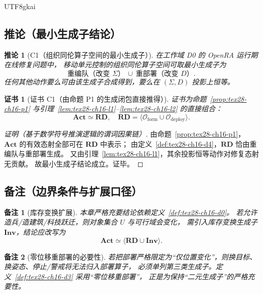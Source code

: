 \documentclass[12pt]{article}
\newtheorem{corollary}{推论}[section]
\newtheorem{remark}{备注}[section]
\newtheorem{Certificate}{证书}[section]
\begin{document}
\begin{CJK*}{UTF8}{gkai}
\subsection{推论（最小生成子结论）}
\label{subsec:tex28-ch16-cor}

\begin{corollary}[C1（组织同伦算子空间的最小生成子）]
\label{cor:tex28-ch16-c1}
在工作域 D0 的 OpenRA 运行期在线修复问题中，
移动单元控制的组织同伦算子空间可取最小生成子为
\[
  \boxed{
    \text{重编队（改变 }\Sigma\text{）}
    \ \cup\
    \text{重部署（改变 }D\text{）}
  }.
\]
任何其他动作要么可由该生成子合成得到，要么在 $(\Sigma,D)$ 投影上恒等。
\end{corollary}

\begin{Certificate}[证书 C1（由命题 P1 的生成闭包直接推得）]
\label{cert:tex28-ch16-c1}
证书为命题~\ref{prop:tex28-ch16-p1} 与引理~\ref{lem:tex28-ch16-l1}--\ref{lem:tex28-ch16-l2} 的直接组合：
\[
  \mathbf{Act}\simeq\mathbf{RD},
  \quad
  \mathbf{RD}=\langle\mathcal O_{\mathrm{form}}\cup\mathcal O_{\mathrm{deploy}}\rangle.
\]
\end{Certificate}

\begin{proof}[证明（基于数学符号推演逻辑的谓词因果链）]
由命题~\ref{prop:tex28-ch16-p1}，
$\mathbf{Act}$ 的有效态射全部可在 $\mathbf{RD}$ 中表示；
由定义~\ref{def:tex28-ch16-d4}，$\mathbf{RD}$ 恰由重编队与重部署生成。
又由引理~\ref{lem:tex28-ch16-l1}，其余投影恒等动作对修复态射无贡献。
故最小生成子结论成立。证毕。
\end{proof}

\subsection{备注（边界条件与扩展口径）}
\label{subsec:tex28-ch16-remarks}

\begin{remark}[库存变换扩展]
本章严格充要结论依赖定义~\ref{def:tex28-ch16-d0}。
若允许造兵/造建筑/科技跃迁，则对象集合 $U$ 与可行域会变化，
需引入库存变换生成子 $\mathbf{Inv}$，结论应改写为
\[
  \mathbf{Act}\simeq\langle\mathbf{RD}\cup\mathbf{Inv}\rangle.
\]
\end{remark}

\begin{remark}[零位移重部署的必要性]
若把部署严格限定为“仅位置变化”，则换目标、换姿态、停止/警戒将无法归入部署算子，
必须单列第三类生成子。定义~\ref{def:tex28-ch16-d3} 采用“零位移重部署”，
正是为保持“二元生成子”的严格充要性。
\end{remark}


\end{CJK*}
\end{document}
